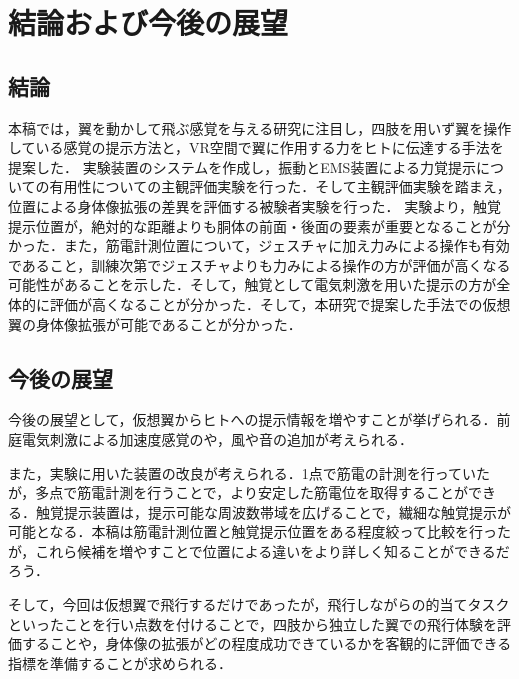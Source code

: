 \chapter[結論および今後の展望]%
        {結論および今後の展望}

\section{結論}
    本稿では，翼を動かして飛ぶ感覚を与える研究に注目し，四肢を用いず翼を操作している感覚の提示方法と，VR空間で翼に作用する力をヒトに伝達する手法を提案した．
    実験装置のシステムを作成し，振動とEMS装置による力覚提示についての有用性についての主観評価実験を行った．そして主観評価実験を踏まえ，位置による身体像拡張の差異を評価する被験者実験を行った．
    実験より，触覚提示位置が，絶対的な距離よりも胴体の前面・後面の要素が重要となることが分かった．また，筋電計測位置について，ジェスチャに加え力みによる操作も有効であること，訓練次第でジェスチャよりも力みによる操作の方が評価が高くなる可能性があることを示した．そして，触覚として電気刺激を用いた提示の方が全体的に評価が高くなることが分かった．そして，本研究で提案した手法での仮想翼の身体像拡張が可能であることが分かった．

    
\section{今後の展望}
    今後の展望として，仮想翼からヒトへの提示情報を増やすことが挙げられる．前庭電気刺激による加速度感覚\cite{maeda2005shaking}\cite{青山一真2014前庭電気刺激における逆方向不感電流を用いた加速度感覚の増強}のや，風や音の追加が考えられる．

    また，実験に用いた装置の改良が考えられる．1点で筋電の計測を行っていたが，多点で筋電計測を行うことで，より安定した筋電位を取得することができる\cite{白石恵1992筋電位多点計測による体幹背部の神経支配帯の分布}．触覚提示装置は，提示可能な周波数帯域を広げることで，繊細な触覚提示が可能となる．本稿は筋電計測位置と触覚提示位置をある程度絞って比較を行ったが，これら候補を増やすことで位置による違いをより詳しく知ることができるだろう．

    そして，今回は仮想翼で飛行するだけであったが，飛行しながらの的当てタスクといったことを行い点数を付けることで，四肢から独立した翼での飛行体験を評価することや，身体像の拡張がどの程度成功できているかを客観的に評価できる指標を準備することが求められる．
  
